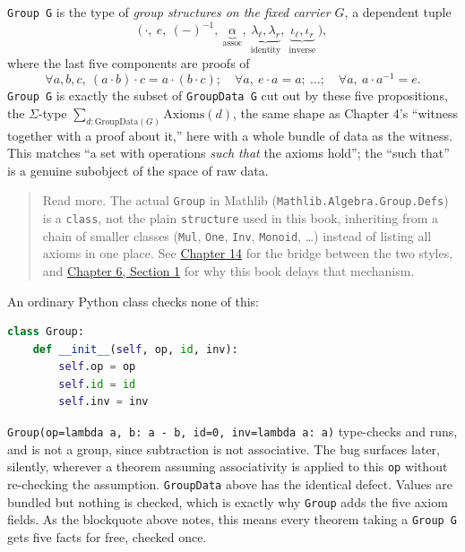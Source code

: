 \begin{mathreading}

\texttt{Group G} is the type of \emph{group structures on the fixed carrier \(G\)}, a dependent tuple \[
\Big(\,\cdot,\ e,\ (-)^{-1},\ \underbrace{\alpha}_{\text{assoc}},\
\underbrace{\lambda_\ell,\lambda_r}_{\text{identity}},\
\underbrace{\iota_\ell,\iota_r}_{\text{inverse}}\,\Big),
\] where the last five components are proofs of \[
\forall a,b,c,\ (a\cdot b)\cdot c = a\cdot(b\cdot c);\quad
\forall a,\ e\cdot a = a;\ \ldots;\quad \forall a,\ a\cdot a^{-1}=e.
\] \texttt{Group G} is exactly the subset of \texttt{GroupData G} cut out by these five propositions, the \(\Sigma\)-type \(\sum_{d : \mathrm{GroupData}(G)}
\mathrm{Axioms}(d)\), the same shape as Chapter 4's ``witness together with a proof about it,'' here with a whole bundle of data as the witness. This matches ``a set with operations \emph{such that} the axioms hold''; the ``such that'' is a genuine subobject of the space of raw data.

\end{mathreading}

\begin{quote}
Read more. The actual \texttt{Group} in Mathlib (\texttt{Mathlib.Algebra.Group.Defs}) is a \texttt{class}, not the plain \texttt{structure} used in this book, inheriting from a chain of smaller classes (\texttt{Mul}, \texttt{One}, \texttt{Inv}, \texttt{Monoid}, \ldots) instead of listing all axioms in one place. See \hyperref[sec:14-next-steps:02-moving-to-mathlib:1]{Chapter 14} for the bridge between the two styles, and \hyperref[sec:06-rigor-check:01-structure-vs-class:1]{Chapter 6, Section 1} for why this book delays that mechanism.
\end{quote}

\begin{progcorner}

An ordinary Python class checks none of this:

\end{progcorner}

\begin{lstlisting}[language=Python,style=python]
class Group:
    def __init__(self, op, id, inv):
        self.op = op
        self.id = id
        self.inv = inv
\end{lstlisting}

\texttt{Group(op=lambda a, b: a -\allowbreak{} b, id=0, inv=lambda a: a)} type-checks and runs, and is not a group, since subtraction is not associative. The bug surfaces later, silently, wherever a theorem assuming associativity is applied to this \texttt{op} without re-checking the assumption. \texttt{GroupData} above has the identical defect. Values are bundled but nothing is checked, which is exactly why \texttt{Group} adds the five axiom fields. As the blockquote above notes, this means every theorem taking a \texttt{Group G} gets five facts for free, checked once.
